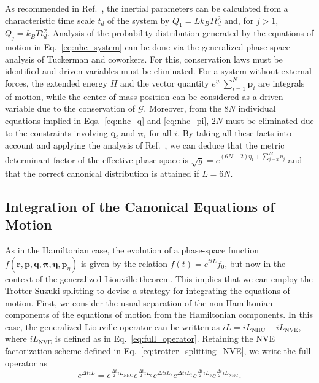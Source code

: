 \documentclass[aip,jcp,reprint,amsmath,amssymb]{revtex4-1}
\newcommand{\vt}[1]{\boldsymbol{\mathbf{#1}}}           %
\begin{document}
As recommended in Ref.~, the inertial parameters can be calculated from a characteristic time scale $t_d$ of the system by $Q_1 = L k_B T t_d^2$ and, for $j > 1$, $Q_j = k_B T t_d^2$. Analysis of the probability distribution generated by the equations of motion in Eq.~\ref{eq:nhc_system} can be done via the generalized phase-space analysis of Tuckerman and coworkers.\cite{Tuckerman2001} For this, conservation laws must be identified and driven variables must be eliminated. For a system without external forces, the extended energy $H$ and the vector quantity $e^{\eta_1}\sum_{i=1}^N {\vt p}_i$ are integrals of motion, while the center-of-mass position can be considered as a driven variable due to the conservation of $\boldsymbol{\mathcal G}$.\cite{Tuckerman2001} Moreover, from the $8N$ individual equations implied in Eqs.~\ref{eq:nhc_q} and \ref{eq:nhc_pi}, $2N$ must be eliminated due to the constraints involving $\vt q_i$ and $\vt \pi_i$ for all $i$. By taking all these facts into account and applying the analysis of Ref.~, we can deduce that the metric determinant factor of the effective phase space is $\sqrt{g} = e^{(6N-2) \eta_1 + \sum_{j=2}^M \eta_j}$ and that the correct canonical distribution is attained if $L = 6N$.

\subsection{Integration of the Canonical Equations of Motion}

As in the Hamiltonian case, the evolution of a phase-space function $f(\vt r, \vt p, \vt q, \vt \pi, \vt \eta,{\vt p}_\eta)$ is given by the relation $f(t) = e^{t i\!L}f_0$, but now in the context of the generalized Liouville theorem.\cite{Tuckerman_1999, Tuckerman2001} This implies that we can employ the Trotter-Suzuki splitting to devise a strategy for integrating the equations of motion. First, we consider the usual separation of the non-Hamiltonian components of the equations of motion from the Hamiltonian components. In this case, the generalized Liouville operator can be written as $i\!L = i\!L_\text{NHC} + i\!L_\text{NVE}$, where $i\!L_\text{NVE}$ is defined as in Eq.~\ref{eq:full_operator}. Retaining the NVE factorization scheme defined in Eq.~\ref{eq:trotter_splitting_NVE}, we write the full operator as\cite{Martyna1996}
\begin{equation}
\label{eq:trotter_splitting_NHC}
e^{\Delta t i\!L} = e^{\frac{\Delta t}{2} i\!L_\text{NHC}} e^{\frac{\Delta t}{2} i\!L_b} e^{\Delta t i\!L_r} e^{\Delta t i\!L_t}  e^{\frac{\Delta t}{2} i\!L_b} e^{\frac{\Delta t}{2} i\!L_\text{NHC}}.
\end{equation}
\end{document}
